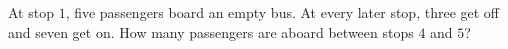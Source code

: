 At stop $1$, five passengers board an empty bus. At every later stop, three get off and seven get on. How many passengers are aboard between stops $4$ and $5$?
